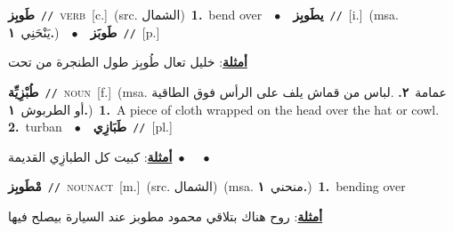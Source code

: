\documentclass[10pt,a4paper,twoside]{article} %
\begin{document}
\begin{multicols}{2}
{{{{{{{{{{{{\setlength\topsep{0pt}\textbf{\foreignlanguage{arabic}{طَوبِز}}\ {\color{gray}\texttt{//}\color{black}}\ \textsc{verb}\ [c.]\ (src. \color{gray}\foreignlanguage{arabic}{الشمال}\color{black})\ \textbf{1.}~bend over\ \ $\bullet$\ \ \setlength\topsep{0pt}\textbf{\foreignlanguage{arabic}{يطَوبِز}}\ {\color{gray}\texttt{//}\color{black}}\ [i.]\ \color{gray}(msa. \foreignlanguage{arabic}{يَنْحَنِي}~\foreignlanguage{arabic}{\textbf{١.}})\color{black}\ \ $\bullet$\ \ \setlength\topsep{0pt}\textbf{\foreignlanguage{arabic}{طَوبَز}}\ {\color{gray}\texttt{//}\color{black}}\ [p.]\  \begin{flushright}\color{gray}\foreignlanguage{arabic}{\textbf{\underline{\foreignlanguage{arabic}{أمثلة}}}: خليل تعال طُوبِز طول الطنجرة من تحت}\end{flushright}\color{black}} \vspace{2mm}

{\setlength\topsep{0pt}\textbf{\foreignlanguage{arabic}{طُبْزِيِّة}}\ {\color{gray}\texttt{//}\color{black}}\ \textsc{noun}\ [f.]\ \color{gray}(msa. \foreignlanguage{arabic}{عمامة}~\foreignlanguage{arabic}{\textbf{٢.}}  .\foreignlanguage{arabic}{لباس من قماش يلف على الرأس فوق الطاقية أو الطربوش}~\foreignlanguage{arabic}{\textbf{١.}})\color{black}\ \textbf{1.}~A piece of cloth wrapped on the head over the hat or cowl.  \textbf{2.}~turban\ \ $\bullet$\ \ \setlength\topsep{0pt}\textbf{\foreignlanguage{arabic}{طَبَازِي}}\ {\color{gray}\texttt{//}\color{black}}\ [pl.]\  \begin{flushright}\color{gray}\foreignlanguage{arabic}{\textbf{\underline{\foreignlanguage{arabic}{أمثلة}}}: كبيت كل الطبازِي القديمة\ $\bullet$\ \  \ $\bullet$\ \  }\end{flushright}\color{black}} \vspace{2mm}

{\setlength\topsep{0pt}\textbf{\foreignlanguage{arabic}{مْطَوبِز}}\ {\color{gray}\texttt{//}\color{black}}\ \textsc{noun\textunderscore act}\ [m.]\ (src. \color{gray}\foreignlanguage{arabic}{الشمال}\color{black})\ \color{gray}(msa. \foreignlanguage{arabic}{منحني}~\foreignlanguage{arabic}{\textbf{١.}})\color{black}\ \textbf{1.}~bending over\  \begin{flushright}\color{gray}\foreignlanguage{arabic}{\textbf{\underline{\foreignlanguage{arabic}{أمثلة}}}: روح هناك بتلاقي محمود مطوبز عند السيارة بيصلح فيها}\end{flushright}\color{black}} \vspace{2mm}

}}}}}}}}}}}
\end{multicols}
\end{document}
